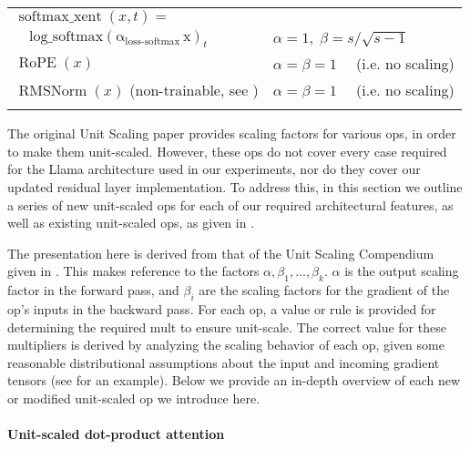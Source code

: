 \begin{table}[h]
\begin{tabular}{lp{6.5cm}}
    $\operatorname{softmax\_xent}(x, t) =$
    &
    \\
    $\quad \operatorname{log\_softmax(\alpha_\mathrm{loss\text{-}softmax} \, x)}_t$
    &
    $\alpha=1, \; \beta = s / \sqrt{s-1}$
    \\[1.5em]

    $\operatorname{RoPE}(x)$
    &
    $\alpha=\beta=1 \quad$ (i.e. no scaling)
    \\[1.5em]

    $\operatorname{RMSNorm}(x)$ (non-trainable, see \citep{Exploration_Of_Mu_Transfer})
    &
    $\alpha=\beta=1 \quad$ (i.e. no scaling)
    \\[0.5em]
    
    \bottomrule
    \vspace{1em}
\end{tabular}
\end{table}

\FloatBarrier

The original Unit Scaling paper provides scaling factors for various ops, in order to make them unit-scaled. However, these ops do not cover every case required for the Llama architecture used in our experiments, nor do they cover our updated residual layer implementation. 
To address this, in this section we outline a series of new unit-scaled ops for each of our required architectural features, as well as existing unit-scaled ops, as given in .

The presentation here is derived from that of the Unit Scaling Compendium given in \citep[Table A.2]{Unit_Scaling}. This makes reference to the factors $\alpha, \beta_1, \dots, \beta_k$. $\alpha$ is the output scaling factor in the forward pass, and $\beta_i$ are the scaling factors for the gradient of the op's inputs in the backward pass. For each op, a value or rule is provided for determining the required mult to ensure unit-scale. The correct value for these multipliers is derived by analyzing the scaling behavior of each op, given some reasonable distributional assumptions about the input and incoming gradient tensors (see  for an example). Below we provide an in-depth overview of each new or modified unit-scaled op we introduce here.

\paragraph{Unit-scaled dot-product attention}

